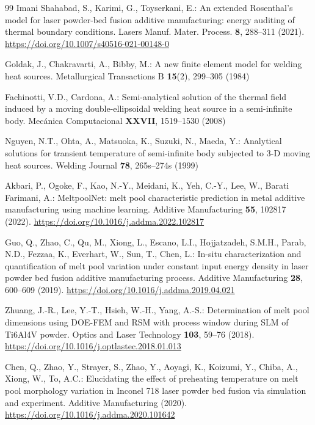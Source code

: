 \documentclass[12pt]{article}
\begin{document}
\begin{thebibliography}{99}
Imani Shahabad, S., Karimi, G., Toyserkani, E.: An extended Rosenthal's model for laser powder-bed fusion additive manufacturing: energy auditing of thermal boundary conditions. Lasers Manuf. Mater. Process. \textbf{8}, 288--311 (2021). \url{https://doi.org/10.1007/s40516-021-00148-0}

Goldak, J., Chakravarti, A., Bibby, M.: A new finite element model for welding heat sources. Metallurgical Transactions B \textbf{15}(2), 299--305 (1984)

Fachinotti, V.D., Cardona, A.: Semi-analytical solution of the thermal field induced by a moving double-ellipsoidal welding heat source in a semi-infinite body. Mec\'anica Computacional \textbf{XXVII}, 1519--1530 (2008)

Nguyen, N.T., Ohta, A., Matsuoka, K., Suzuki, N., Maeda, Y.: Analytical solutions for transient temperature of semi-infinite body subjected to 3-D moving heat sources. Welding Journal \textbf{78}, 265s--274s (1999)

Akbari, P., Ogoke, F., Kao, N.-Y., Meidani, K., Yeh, C.-Y., Lee, W., Barati Farimani, A.: MeltpoolNet: melt pool characteristic prediction in metal additive manufacturing using machine learning. Additive Manufacturing \textbf{55}, 102817 (2022). \url{https://doi.org/10.1016/j.addma.2022.102817}

Guo, Q., Zhao, C., Qu, M., Xiong, L., Escano, L.I., Hojjatzadeh, S.M.H., Parab, N.D., Fezzaa, K., Everhart, W., Sun, T., Chen, L.: In-situ characterization and quantification of melt pool variation under constant input energy density in laser powder bed fusion additive manufacturing process. Additive Manufacturing \textbf{28}, 600--609 (2019). \url{https://doi.org/10.1016/j.addma.2019.04.021}

Zhuang, J.-R., Lee, Y.-T., Hsieh, W.-H., Yang, A.-S.: Determination of melt pool dimensions using DOE-FEM and RSM with process window during SLM of Ti6Al4V powder. Optics and Laser Technology \textbf{103}, 59--76 (2018). \url{https://doi.org/10.1016/j.optlastec.2018.01.013}

Chen, Q., Zhao, Y., Strayer, S., Zhao, Y., Aoyagi, K., Koizumi, Y., Chiba, A., Xiong, W., To, A.C.: Elucidating the effect of preheating temperature on melt pool morphology variation in Inconel 718 laser powder bed fusion via simulation and experiment. Additive Manufacturing (2020). \url{https://doi.org/10.1016/j.addma.2020.101642}


\end{thebibliography}
\end{document}
